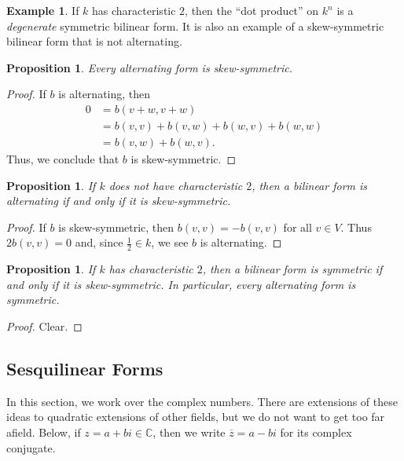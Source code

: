 \documentclass[12pt]{article}
\theoremstyle{plain}
\newtheorem{proposition}[theorem]{Proposition}
\theoremstyle{definition}
\newtheorem{example}[theorem]{Example}
\theoremstyle{remark}
\numberwithin{equation}{section}
\begin{document}
\begin{example}
If $k$ has characteristic $2$, then the ``dot product''
on $k^n$ is a \emph{degenerate} symmetric bilinear form.
It is also an example of a skew-symmetric bilinear form that is not
alternating.
\end{example}

\begin{proposition}
Every alternating form is skew-symmetric.
\end{proposition}

\begin{proof}
If $b$ is alternating, then
\begin{align*}
0 &= b(v+w,v+w)\\
&= b(v,v) + b(v,w) + b(w,v) + b(w,w)\\
&= b(v,w)+b(w,v)
.\end{align*}
Thus, we conclude that $b$ is skew-symmetric.
\end{proof}

\begin{proposition}
If $k$ does \emph{not} have characteristic $2$, then a bilinear form is
alternating if and only if it is skew-symmetric.
\end{proposition}

\begin{proof}
If $b$ is skew-symmetric, then $b(v,v)=-b(v,v)$ for all $v \in V$.
Thus $2b(v,v)=0$ and, since $\frac{1}{2} \in k$,
we see $b$ is alternating.
\end{proof}

\begin{proposition}
If $k$ has characteristic $2$, then a bilinear form is
symmetric if and only if it is skew-symmetric.
In particular, every alternating form is symmetric.
\end{proposition}

\begin{proof}
Clear.
\end{proof}

\subsection{Sesquilinear Forms}

In this section, we work over the complex numbers.
There are extensions of these ideas to quadratic extensions of other
fields, but we do not want to get too far afield.
Below, if $z=a+bi \in \mathbb{C}$, then we write
$\overline{z}=a-bi$ for its complex conjugate.
\end{document}
